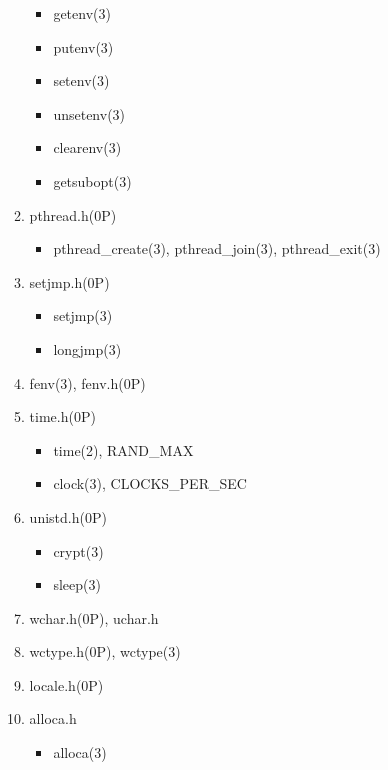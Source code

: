 \documentclass{article}
\begin{document}
\begin{enumerate}
\begin{enumerate}
\begin{itemize}
                    \item getenv(3)
                    \item putenv(3)
                    \item setenv(3)
                    \item unsetenv(3)
                    \item clearenv(3)

                    \item getsubopt(3)
                \end{itemize}
            \item pthread.h(0P)
                \begin{itemize}
                    \item pthread_create(3), pthread_join(3), pthread_exit(3)
                \end{itemize}
            \item setjmp.h(0P)
                \begin{itemize}
                    \item setjmp(3)
                    \item longjmp(3)
                \end{itemize}
            \item fenv(3), fenv.h(0P)
            \item time.h(0P)
                \begin{itemize}
                    \item time(2), RAND_MAX
                    \item clock(3), CLOCKS_PER_SEC
                \end{itemize}
            \item unistd.h(0P)
                \begin{itemize}
                    \item crypt(3)
                    \item sleep(3)
                \end{itemize}
            \item wchar.h(0P), uchar.h
            \item wctype.h(0P), wctype(3)
            \item locale.h(0P)
            \item alloca.h
                \begin{itemize}
                    \item alloca(3)
                \end{itemize}

\end{enumerate}
\end{enumerate}
\end{document}
